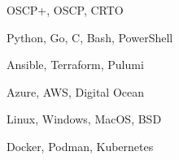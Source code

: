 \item[\textbf{Certifications}] OSCP+, OSCP, CRTO
\item[\textbf{Languages}] Python, Go, C, Bash, PowerShell
\item[\textbf{Automation}] Ansible, Terraform, Pulumi
\item[\textbf{Cloud}] Azure, AWS, Digital Ocean
\item[\textbf{OS}] Linux, Windows, MacOS, BSD
\item[\textbf{Containers}] Docker, Podman, Kubernetes
